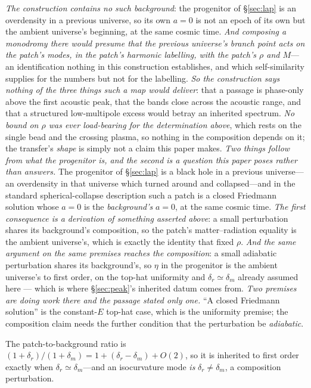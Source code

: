 \documentclass[11pt,a4paper]{article}
\theoremstyle{plain}
\theoremstyle{definition}
\theoremstyle{remark}
\begin{document}
\emph{The construction contains no such background}: the progenitor of \S\ref{sec:lap} is an overdensity in a previous universe, so its own $a=0$ is not an epoch of its own but the ambient universe's beginning, at the same cosmic time. \emph{And composing a monodromy there would presume that the previous universe's branch point acts on the patch's modes, in the patch's harmonic labelling, with the patch's $\rho$ and $M$}---an identification nothing in this construction establishes, and which self-similarity supplies for the numbers but not for the labelling. \emph{So the construction says nothing of the three things such a map would deliver}: that a passage is phase-only above the first acoustic peak, that the bands close across the acoustic range, and that a structured low-multipole excess would betray an inherited spectrum. \emph{No bound on $\rho$ was ever load-bearing for the determination above}, which rests on the single bead and the crossing plasma, so nothing in the composition depends on it; the transfer's \emph{shape} is simply not a claim this paper makes. \emph{Two things follow from what the progenitor is, and the second is a question this paper poses rather than answers.} The progenitor of \S\ref{sec:lap} is a black hole in a previous universe---an overdensity in that universe which turned around and collapsed---and in the standard spherical-collapse description such a patch is a closed Friedmann solution whose $a=0$ is the \emph{background's} $a=0$, at the same cosmic time. \emph{The first consequence is a derivation of something asserted above}: a small perturbation shares its background's composition, so the patch's matter--radiation equality is the ambient universe's, which is exactly the identity that fixed $\rho$. \emph{And the same argument on the same premises reaches the composition}: a small adiabatic perturbation shares its background's, so $\eta$ in the progenitor is the ambient universe's to first order, on the top-hat uniformity and $\delta_r\simeq\delta_m$ already assumed here --- which is where \S\ref{sec:peak}'s inherited datum comes from. \emph{Two premises are doing work there and the passage stated only one.} ``A closed Friedmann solution'' is the constant-$E$ top-hat case, which is the uniformity premise; the composition claim needs the further condition that the perturbation be \emph{adiabatic}. 

The patch-to-background ratio is $(1+\delta_{r})/(1+\delta_{m})=1+(\delta_{r}-\delta_{m})+O(2)$, so it is inherited to first order exactly when $\delta_{r}\simeq\delta_{m}$---and an isocurvature mode \emph{is} $\delta_{r}\neq\delta_{m}$, a composition perturbation. 
\end{document}
